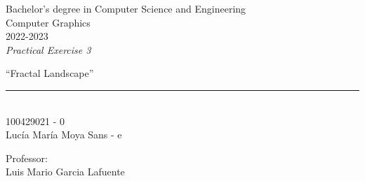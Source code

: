 \begin{titlepage}
    \begin{sffamily}
    \color{azulUC3M}
    \begin{center}
        \begin{figure}[H]
        \end{figure}
        \vspace{1.5cm}
        \begin{Large}
            Bachelor's degree in Computer Science and Engineering\\
            Computer Graphics\\
            2022-2023\\
            \vspace{2cm}
            \textsl{Practical Exercise 3}
            \bigskip

        \end{Large}
            {\Huge ``Fractal Landscape''}\\
            \vspace*{0.5cm}
            \rule{10.5cm}{0.1mm}\\
            \vspace*{0.9cm}
            {\LARGE 100429021 - 0}\\
            \vspace*{0.2cm}
            {\LARGE Lucía María Moya Sans - e}\\
            \vspace*{0.2cm}

            \vspace*{0.8cm}
        \begin{Large}
            Professor:\\
            Luis Mario Garcia Lafuente\\
        \end{Large}
    \end{center}
    \vfill

    \end{sffamily}
\end{titlepage}
